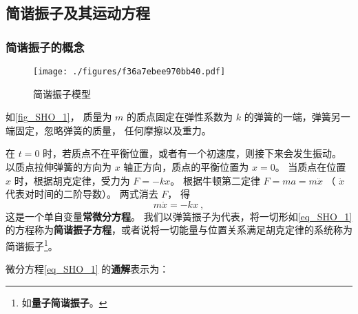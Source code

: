 


\subsection{简谐振子及其运动方程}

\subsubsection{简谐振子的概念}

\begin{figure}[ht]
\centering
\texttt{[image: ./figures/f36a7ebee970bb40.pdf]}
\caption{简谐振子模型} \label{fig_SHO_1}
\end{figure}

如\autoref{fig_SHO_1}， 质量为 $m$ 的质点固定在弹性系数为 $k$ 的弹簧的一端，弹簧另一端固定，忽略弹簧的质量， 任何摩擦以及重力。

在 $t = 0$ 时，若质点不在平衡位置，或者有一个初速度，则接下来会发生振动。 以质点拉伸弹簧的方向为 $x$ 轴正方向，质点的平衡位置为 $x = 0$。 当质点在位置 $x$ 时，根据胡克定律，受力为 $F =  - kx$。 根据牛顿第二定律 $F = ma = m\ddot x$ （ $\ddot x$ 代表对时间的二阶导数）。  两式消去 $F$， 得
\begin{equation}\label{eq_SHO_1}
m\ddot x =  - kx~,
\end{equation}
这是一个单自变量\textbf{常微分方程}。 我们以弹簧振子为代表，将一切形如\autoref{eq_SHO_1} 的方程称为\textbf{简谐振子方程}，或者说将一切能量与位置关系满足胡克定律的系统称为简谐振子\footnote{如\textbf{量子简谐振子}。}。




微分方程\autoref{eq_SHO_1} 的\textbf{通解}表示为：

